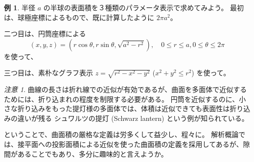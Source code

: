 \documentclass[a4paper]{jsarticle}
\theoremstyle{definition}
\newtheorem{Example}[Theorem]{例}
\theoremstyle{remark}
\newtheorem{Remark}{注意}
\begin{document}
\begin{Example}
半径 $a$ の半球の表面積を３種類のパラメータ表示で求めてみよう。
最初は、球極座標によるもので、既に計算したように $2\pi a^2$。

二つ目は、円筒座標による
\[
(x,y,z) = (r\cos\theta,r\sin\theta, \sqrt{a^2-r^2}), 
\quad 
0 \leq r \leq a, 0 \leq \theta \leq 2\pi 
\]
を使って、

三つ目は、素朴なグラフ表示
$z = \sqrt{r^2-x^2-y^2}$ ($x^2+y^2 \leq r^2$) を使って。
\end{Example}




\begin{Remark}
  {\small
  曲線の長さは折れ線での近似が有効であるが、曲面を多面体で近似するためには、折り込まれの程度を制限する必要がある。
  円筒を近似するのに、小さな折り込みをもった提灯様の多面体では、体積は近似できても表面性は折り込みの違いが残る 
  シュワルツの提灯 (Schwarz lantern) という例が知られている。
  
  ということで、曲面積の厳格な定義は労多くして益少し、程々に。
  解析概論では、接平面への投影面積による近似を使った曲面積の定義を採用してあるが、隙間があることでもあり、多分に趣味的と言えようか。}
\end{Remark}




\bigskip
{}
\end{document}
